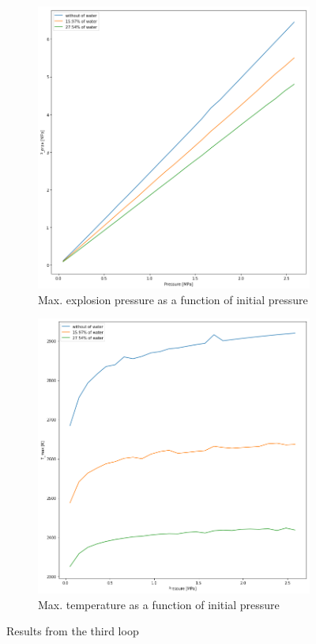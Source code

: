 \documentclass[a4paper]{article}
\begin{document}
\begin{figure}[H]
    \centering
    \begin{subfigure}[h]{0.4\textwidth}
        \includegraphics[width=\textwidth]{3_Pmax_to_P_2.png}
        	\caption{Max. explosion pressure as a function of initial pressure}
        \label{fig:3_1}
    \end{subfigure}
    \qquad
    \begin{subfigure}[h]{0.4\textwidth}
        \includegraphics[width=\textwidth]{3_Tmax_to_P.png}
        	\caption{Max. temperature as a function of initial pressure}
        \label{fig:3_2}
    \end{subfigure}
    \caption{Results from the third loop}\label{fig:3}
\end{figure}




\end{document}

